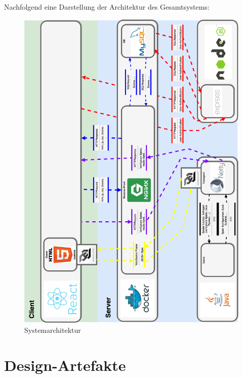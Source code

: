 \documentclass[11pt,ngerman]{article}
\begin{document}
        Nachfolgend eine Darstellung der Architektur des Gesamtsystems:
        \begin{figure}[H]
            \includegraphics[scale=0.4]{figures/architecture-draft_v3.png}
            \caption{Systemarchitektur}
        \end{figure}
        \newpage

    \section{Design-Artefakte}
\end{document}
